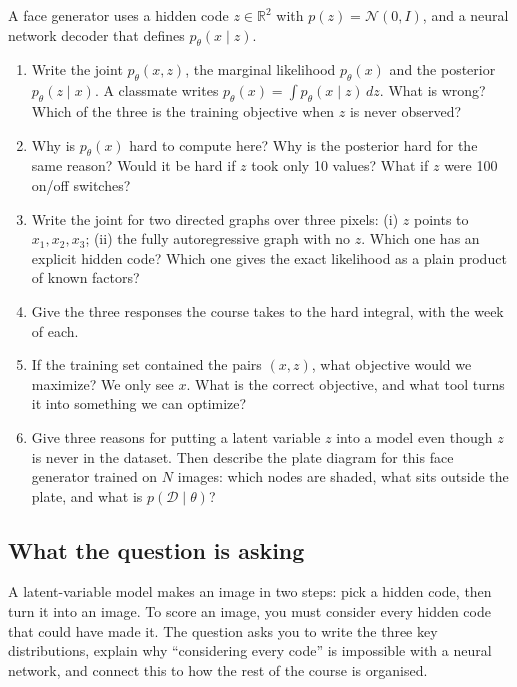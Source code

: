 \documentclass[12pt,a4paper]{article}
\begin{document}
A face generator uses a hidden code $z\in\mathbb{R}^2$ with $p(z)=\mathcal{N}(0,I)$, and a neural network decoder that defines $p_\theta(x\mid z)$.
\begin{enumerate}[label=(\alph*)]
  \item[\colorbox{yellow}{(a)}] Write the joint $p_\theta(x,z)$, the marginal likelihood $p_\theta(x)$ and the posterior $p_\theta(z\mid x)$. A classmate writes $p_\theta(x)=\int p_\theta(x\mid z)\,dz$. What is wrong? Which of the three is the training objective when $z$ is never observed?
  \item Why is $p_\theta(x)$ hard to compute here? Why is the posterior hard for the same reason? Would it be hard if $z$ took only 10 values? What if $z$ were 100 on/off switches?
  \item[\colorbox{yellow}{(c)}] Write the joint for two directed graphs over three pixels: (i) $z$ points to $x_1,x_2,x_3$; (ii) the fully autoregressive graph with no $z$. Which one has an explicit hidden code? Which one gives the exact likelihood as a plain product of known factors?
  \item[\colorbox{yellow}{(d)}] Give the three responses the course takes to the hard integral, with the week of each.
  \item[\colorbox{yellow}{(e)}] If the training set contained the pairs $(x,z)$, what objective would we maximize? We only see $x$. What is the correct objective, and what tool turns it into something we can optimize?
  \item[\colorbox{yellow}{(f)}] Give three reasons for putting a latent variable $z$ into a model even though $z$ is never in the dataset. Then describe the plate diagram for this face generator trained on $N$ images: which nodes are shaded, what sits outside the plate, and what is $p(\mathcal{D}\mid\theta)$?
\end{enumerate}

\subsection{What the question is asking}

A latent-variable model makes an image in two steps: pick a hidden code, then turn it into an image. To score an image, you must consider every hidden code that could have made it. The question asks you to write the three key distributions, explain why ``considering every code'' is impossible with a neural network, and connect this to how the rest of the course is organised.
\end{document}
